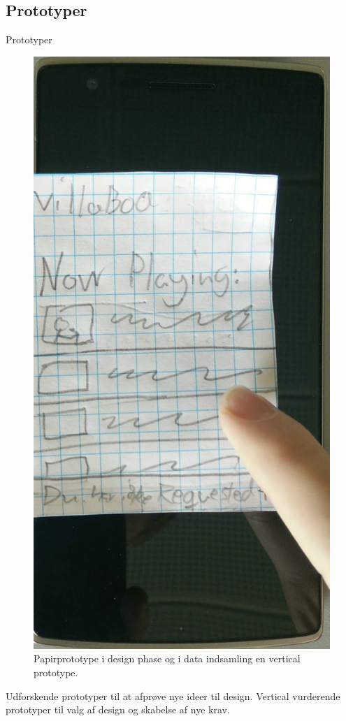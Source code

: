 \subsection{Prototyper}
\begin{frame}{Prototyper}
	\begin{figure}
		\centering
		\includegraphics[height=\textwidth/2]{slides/Heider/paperPrototypeVoteInteraction}
		Papirprototype i design phase og i data indsamling en vertical prototype.
	\end{figure}

	Udforskende prototyper til at afprøve nye ideer til design.
	Vertical vurderende prototyper til valg af design og skabelse af nye krav.
\end{frame}
